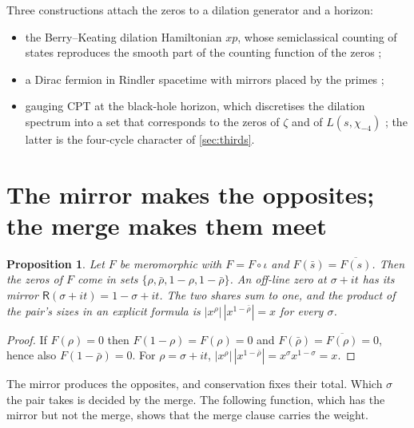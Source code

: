 \documentclass[11pt]{article}
\newtheorem{proposition}[theorem]{Proposition}
\theoremstyle{definition}\newtheorem{definition}[theorem]{Definition}
\theoremstyle{remark}\newtheorem{remark}[theorem]{Remark}
\begin{document}
Three constructions attach the zeros to a dilation generator and a horizon:
\begin{itemize}
\item the Berry--Keating dilation Hamiltonian $xp$, whose semiclassical counting of states reproduces the smooth part of the counting function of the zeros \cite{BerryKeating};
\item a Dirac fermion in Rindler spacetime with mirrors placed by the primes \cite{Sierra};
\item gauging CPT at the black-hole horizon, which discretises the dilation spectrum into a set that corresponds to the zeros of $\zeta$ and of $L(s,\chi_{-4})$ \cite{BGP}; the latter is the four-cycle character of \cref{sec:thirds}.
\end{itemize}

\section{The mirror makes the opposites; the merge makes them meet}\label{sec:mirror}
\begin{proposition}\label{prop:mirror}
Let $F$ be meromorphic with $F=F\circ\iota$ and $F(\bar s)=\overline{F(s)}$. Then the zeros of $F$ come in sets $\{\rho,\bar\rho,1-\rho,1-\bar\rho\}$. An off-line zero at $\sigma+it$ has its mirror $\mathsf R(\sigma+it)=1-\sigma+it$. The two shares sum to one, and the product of the pair's sizes in an explicit formula is $|x^{\rho}|\,|x^{1-\bar\rho}|=x$ for every $\sigma$.
\end{proposition}
\begin{proof}
If $F(\rho)=0$ then $F(1-\rho)=F(\rho)=0$ and $F(\bar\rho)=\overline{F(\rho)}=0$, hence also $F(1-\bar\rho)=0$. For $\rho=\sigma+it$, $|x^\rho|\,|x^{1-\bar\rho}|=x^\sigma x^{1-\sigma}=x$.
\end{proof}
The mirror produces the opposites, and conservation fixes their total. Which $\sigma$ the pair takes is decided by the merge. The following function, which has the mirror but not the merge, shows that the merge clause carries the weight.
\end{document}
